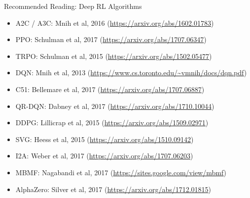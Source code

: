 \documentclass[9pt]{beamer}
\begin{document}
\begin{frame}{Recommended Reading: Deep RL Algorithms}

\begin{itemize}
\item A2C / A3C: Mnih et al, 2016 (\url{https://arxiv.org/abs/1602.01783})
\item PPO: Schulman et al, 2017 (\url{https://arxiv.org/abs/1707.06347})
\item TRPO: Schulman et al, 2015 (\url{https://arxiv.org/abs/1502.05477})
\item DQN: Mnih et al, 2013 (\url{https://www.cs.toronto.edu/~vmnih/docs/dqn.pdf})
\item C51: Bellemare et al, 2017 (\url{https://arxiv.org/abs/1707.06887})
\item QR-DQN: Dabney et al, 2017 (\url{https://arxiv.org/abs/1710.10044})
\item DDPG: Lillicrap et al, 2015 (\url{https://arxiv.org/abs/1509.02971})
\item SVG: Heess et al, 2015 (\url{https://arxiv.org/abs/1510.09142})
\item I2A: Weber et al, 2017 (\url{https://arxiv.org/abs/1707.06203})
\item MBMF: Nagabandi et al, 2017 (\url{https://sites.google.com/view/mbmf})
\item AlphaZero: Silver et al, 2017 (\url{https://arxiv.org/abs/1712.01815})
\end{itemize}

\end{frame}
\end{document}
